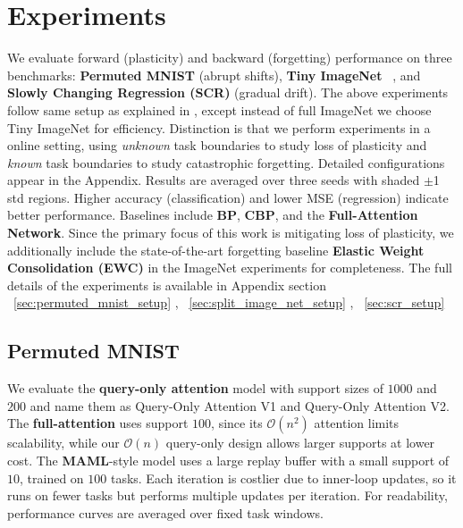 \documentclass{article}
\begin{document}
\section{Experiments}
\label{sec:experiment}
We evaluate forward (plasticity) and backward (forgetting) performance on three benchmarks: 
\textbf{Permuted MNIST} (abrupt shifts), \textbf{Tiny ImageNet} ~\citep{tinyimagenet}, and 
\textbf{Slowly Changing Regression (SCR)} (gradual drift).
The above experiments follow same setup as explained in \citet{dohare2024loss}, except instead of full ImageNet we choose Tiny ImageNet for efficiency.
Distinction is that we perform experiments in a online setting, using \emph{unknown} task boundaries to study loss of plasticity and \emph{known} task boundaries to study catastrophic forgetting.
Detailed configurations appear in the Appendix. 
Results are averaged over three seeds with shaded $\pm$1 std regions. 
Higher accuracy (classification) and lower MSE (regression) indicate better performance. 
Baselines include \textbf{BP}, \textbf{CBP}, and the \textbf{Full-Attention Network}.
Since the primary focus of this work is mitigating loss of plasticity, we additionally include the state-of-the-art forgetting baseline \textbf{Elastic Weight Consolidation (EWC)} in the ImageNet experiments for completeness.
The full details of the experiments is available in Appendix section ~\ref{sec:permuted_mnist_setup} , ~\ref{sec:split_image_net_setup} , ~\ref{sec:scr_setup}


\subsection{Permuted MNIST}
We evaluate the \textbf{query-only attention} model with support sizes of $1000$ and $200$ and
name them as Query-Only Attention V1 and Query-Only Attention V2. 
The \textbf{full-attention} uses support $100$, since its $\mathcal{O}(n^2)$ attention limits scalability, while our $\mathcal{O}(n)$ query-only design allows larger supports at lower cost. 
The \textbf{MAML}-style model uses a large replay buffer with a small support of $10$, trained on $100$ tasks. 
Each iteration is costlier due to inner-loop updates, so it runs on fewer tasks but performs multiple updates per iteration.
For readability, performance curves are averaged over fixed task windows.
\end{document}
